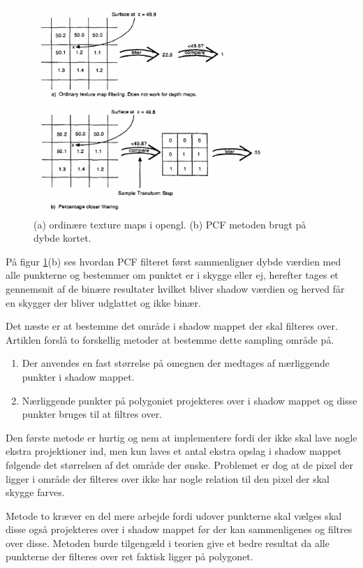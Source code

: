 \documentclass[11pt,a4paper]{article}
\begin{document}
\begin{figure}[ht!]
\centering
\includegraphics[width=90mm]{img/PCF1.png}
\caption{(a) ordinære texture maps i opengl. (b) PCF metoden brugt på dybde kortet.}
\label{P4}
\end{figure}


På figur \ref{P4}(b) ses hvordan PCF filteret først sammenligner dybde værdien med alle punkterne og bestemmer om punktet er i skygge eller ej, herefter tages et gennemsnit af de binære resultater hvilket bliver shadow værdien og herved får en skygger der bliver udglattet og ikke binær.


Det næste er at bestemme det område i shadow mappet der skal filteres over. Artiklen \cite{PCF} forslå to forskellig metoder at bestemme dette sampling område på.

\begin{enumerate}
\item Der anvendes en fast størrelse på omegnen der medtages af nærliggende punkter i shadow mappet.
\item Nærliggende punkter på polygoniet projekteres over i shadow mappet og disse punkter bruges til at filtres over.
\end{enumerate}

Den første metode er hurtig og nem at implementere fordi der ikke skal lave nogle ekstra projektioner ind, men kun laves et antal ekstra opslag i shadow mappet følgende det størrelsen af det område der ønske. Problemet er dog at de pixel der ligger i område der filteres over ikke har nogle relation til den pixel der skal skygge farves.

Metode to kræver en del mere arbejde fordi udover punkterne skal vælges skal disse også projekteres over i shadow mappet før der kan sammenligenes og filtres over disse. Metoden burde tilgengæld i teorien give et bedre resultat da alle punkterne der filteres over ret faktisk ligger på polygonet. 
\end{document}
